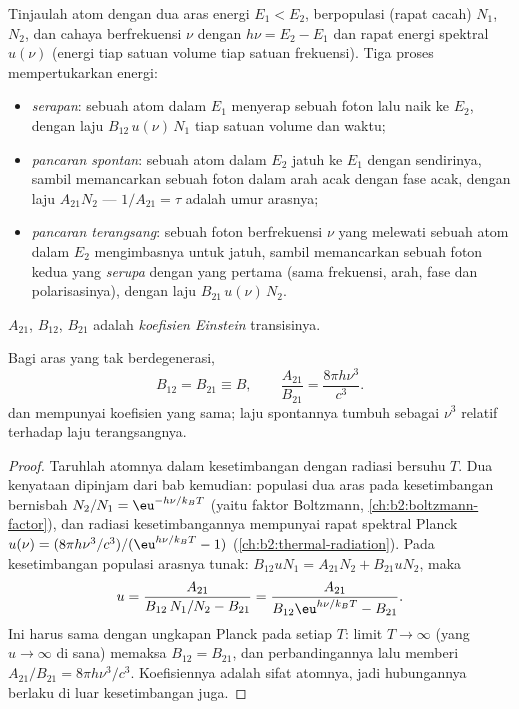 \begin{definition}\label{def:b2:laser:processes}
Tinjaulah atom dengan dua aras energi $E_1 < E_2$, berpopulasi (rapat
cacah) $N_1$, $N_2$, dan cahaya berfrekuensi $\nu$ dengan
$h\nu = E_2 - E_1$ dan rapat energi spektral $u(\nu)$ (energi tiap satuan
volume tiap satuan frekuensi). Tiga proses mempertukarkan energi:
\begin{itemize}
\item \emph{serapan}: sebuah atom dalam
      $E_1$ menyerap sebuah foton lalu naik ke $E_2$, dengan laju
      $B_{12}\,u(\nu)\,N_1$ tiap satuan volume dan waktu;
\item \emph{pancaran spontan}: sebuah atom
      dalam $E_2$ jatuh ke $E_1$ dengan sendirinya, sambil memancarkan sebuah foton dalam arah
      acak dengan fase acak, dengan laju $A_{21}N_2$ ---
      $1/A_{21} = \tau$ adalah umur arasnya;
\item \emph{pancaran terangsang}: sebuah foton
      berfrekuensi $\nu$ yang melewati sebuah atom dalam $E_2$ mengimbasnya untuk jatuh,
      sambil memancarkan sebuah foton kedua yang \emph{serupa} dengan yang pertama (sama
      frekuensi, arah, fase dan polarisasinya), dengan laju
      $B_{21}\,u(\nu)\,N_2$.
\end{itemize}
$A_{21}$, $B_{12}$, $B_{21}$ adalah \emph{koefisien
Einstein} transisinya.
\end{definition}

\begin{proposition}\label{prop:b2:laser:einstein}
Bagi aras yang tak berdegenerasi,
\[
B_{12} = B_{21} \equiv B, \qquad
\frac{A_{21}}{B_{21}} = \frac{8\pi h\nu^3}{c^3}.
\]
 dan  mempunyai koefisien yang sama;
laju spontannya tumbuh sebagai $\nu^3$ relatif terhadap laju terangsangnya.
\end{proposition}

\begin{proof}
Taruhlah atomnya dalam kesetimbangan dengan radiasi bersuhu $T$. Dua
kenyataan dipinjam dari bab kemudian: populasi dua aras
pada kesetimbangan bernisbah $N_2/N_1 = \eu^{-h\nu/k_BT}$ (yaitu
faktor Boltzmann, \cref{ch:b2:boltzmann-factor}), dan radiasi
kesetimbangannya mempunyai rapat spektral Planck
$u(\nu) = (8\pi h\nu^3/c^3)/(\eu^{h\nu/k_BT} - 1)$
(\cref{ch:b2:thermal-radiation}). Pada kesetimbangan populasi arasnya
tunak: $B_{12}uN_1 = A_{21}N_2 + B_{21}uN_2$, maka
\[
u = \frac{A_{21}}{B_{12}\,N_1/N_2 - B_{21}}
  = \frac{A_{21}}{B_{12}\eu^{h\nu/k_BT} - B_{21}}.
\]
Ini harus sama dengan ungkapan Planck pada setiap $T$: limit $T \to \infty$
(yang $u \to \infty$ di sana) memaksa $B_{12} = B_{21}$, dan
perbandingannya lalu memberi $A_{21}/B_{21} = 8\pi h\nu^3/c^3$.
Koefisiennya adalah sifat atomnya, jadi hubungannya berlaku di luar
kesetimbangan juga.
\end{proof}

